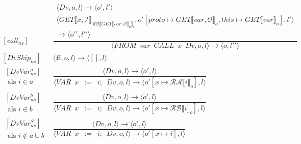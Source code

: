 \documentclass[12pt]{article}
\newcommand{\RA}{\mathcal{RA}}
\newcommand{\RB}{\mathcal{RB}}
\newcommand{\RO}{\mathcal{RO}}
\begin{document}
\[
\begin{matrix}
[call_{ns}] &
\dfrac
{
	\begin{matrix}
	\langle Dv, o, l \rangle \rightarrow \langle o\prime, l\prime \rangle\\
	\langle GET \llbracket x, \mathcal{I} \rrbracket_{\RO \llbracket GET\llbracket var, \mathcal{O} \rrbracket_o \rrbracket_l}, o\prime [proto \mapsto GET\llbracket var, \mathcal{O} \rrbracket_o, this \mapsto GET\llbracket var \rrbracket_o], l\prime \rangle\\
	\rightarrow
	\langle o\prime\prime, l\prime\prime \rangle
	\end{matrix}	
}
{
	\langle FROM \enspace var \enspace CALL \enspace x \enspace Dv,o,l \rangle
	\rightarrow
	\langle o, l\prime\prime \rangle
}\\[60pt]
[DvSkip_{ns}] &
\langle E,o,l \rangle \rightarrow \langle [],l \rangle \\[60pt]
\begin{matrix}
[DvVar_{ns}^{a}]\\
\mbox{ als } i \in a 
\end{matrix}
 &
\dfrac
{	\langle Dv,o,l \rangle \rightarrow \langle o\prime, l \rangle }
{
	\langle VAR \enspace x \enspace := \enspace i; \enspace Dv, o, l \rangle
	\rightarrow
	\langle o\prime[x \mapsto \RA \llbracket i \rrbracket_o], l \rangle
}\\[60pt]
\begin{matrix}
[DvVar_{ns}^{b}]\\
\mbox{ als } i \in b 
\end{matrix}
&
\dfrac
{	\langle Dv,o,l \rangle \rightarrow \langle o\prime, l \rangle }
{
	\langle VAR \enspace x \enspace := \enspace i; \enspace Dv, o, l \rangle
	\rightarrow
	\langle o\prime[x \mapsto \RB \llbracket i \rrbracket_o], l \rangle
}\\[60pt]
\begin{matrix}
[DvVar_{ns}^{S}]\\
\mbox{ als } i \not\in a \cup b 
\end{matrix}
&
\dfrac
{	\langle Dv,o,l \rangle \rightarrow \langle o\prime, l \rangle }
{
	\langle VAR \enspace x \enspace := \enspace i; \enspace Dv, o, l \rangle
	\rightarrow
	\langle o\prime[x \mapsto i ], l \rangle
}\\

\end{matrix}
\]

\end{document}
